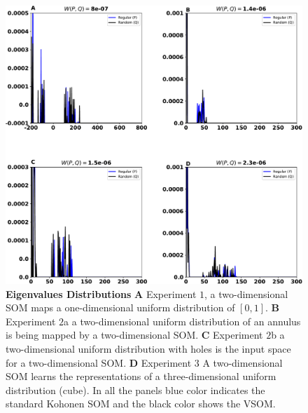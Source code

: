 \documentclass[10pt]{article}
\theoremstyle{definition}
\begin{document}
\begin{figure}[!htpb]
     \centering
     \includegraphics[width=\textwidth]{./figures/eig-distributions.pdf}
     \caption{{\bfseries \sffamily Eigenvalues Distributions}
     {\bfseries \sffamily A} Experiment $1$, a two-dimensional SOM
     maps a one-dimensional uniform distribution of $[0, 1]$.
     {\bfseries \sffamily B} Experiment $2$a a two-dimensional uniform
     distribution of an annulus is being mapped by a two-dimensional SOM\@.
     {\bfseries \sffamily C} Experiment $2$b a two-dimensional uniform
     distribution with holes is the input space for a two-dimensional SOM\@. 
     {\bfseries \sffamily D} Experiment $3$ A two-dimensional SOM learns the
     representations of a three-dimensional uniform distribution (cube). In 
     all the panels blue color indicates the standard Kohonen SOM and the 
     black color shows the VSOM.}%
     \label{Fig:distributions}
\end{figure}


\end{document}

